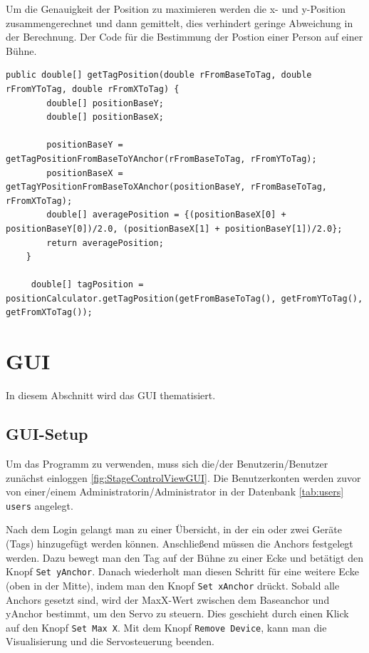 \newpage
Um die Genauigkeit der Position zu maximieren werden die x- und y-Position zusammengerechnet und dann gemittelt, dies verhindert geringe Abweichung in der Berechnung. Der Code für die Bestimmung der Postion einer Person auf einer Bühne. 
\begin{lstlisting}[style=Java, caption=Trilateration in Java, captionpos=b]
	public double[] getTagPosition(double rFromBaseToTag, double rFromYToTag, double rFromXToTag) {
		double[] positionBaseY;
		double[] positionBaseX;
		
		positionBaseY = getTagPositionFromBaseToYAnchor(rFromBaseToTag, rFromYToTag);
		positionBaseX = getTagYPositionFromBaseToXAnchor(positionBaseY, rFromBaseToTag, rFromXToTag);
		double[] averagePosition = {(positionBaseX[0] + positionBaseY[0])/2.0, (positionBaseX[1] + positionBaseY[1])/2.0};
		return averagePosition;
	}
	
	 double[] tagPosition = positionCalculator.getTagPosition(getFromBaseToTag(), getFromYToTag(), getFromXToTag());
\end{lstlisting}

\newpage
\section{GUI}
In diesem Abschnitt wird das GUI thematisiert.

\subsection{GUI-Setup}
Um das Programm zu verwenden, muss sich die/der Benutzerin/Benutzer zunächst einloggen \ref{fig:StageControlViewGUI}. Die Benutzerkonten werden zuvor von einer/einem Administratorin/Administrator in der Datenbank \ref{tab:users} \texttt{users} angelegt.  

Nach dem Login gelangt man zu einer Übersicht, in der ein oder zwei Geräte (Tags) hinzugefügt werden können. Anschließend müssen die Anchors festgelegt werden. Dazu bewegt man den Tag auf der Bühne zu einer Ecke und betätigt den Knopf \texttt{Set yAnchor}. Danach wiederholt man diesen Schritt für eine weitere Ecke (oben in der Mitte), indem man den Knopf \texttt{Set xAnchor} drückt. Sobald alle Anchors gesetzt sind, wird der MaxX-Wert zwischen dem Baseanchor und yAnchor bestimmt, um den Servo zu steuern. Dies geschieht durch einen Klick auf den Knopf \texttt{Set Max X}. Mit dem Knopf \texttt{Remove Device}, kann man die Visualisierung und die Servosteuerung beenden.   

